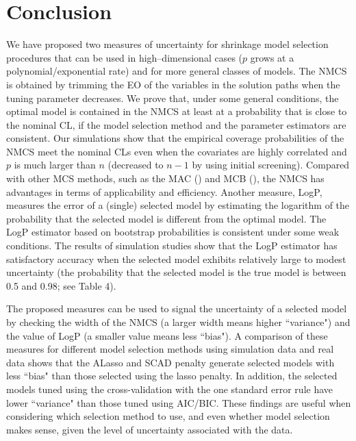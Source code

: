 \documentclass[12pt]{article} %
\theoremstyle{definition}
\begin{document}


\section{Conclusion}
We have proposed two measures of uncertainty for shrinkage model selection procedures that can be used in high–dimensional cases ($p$ grows at a polynomial/exponential rate) and for more general classes of models. The NMCS is obtained by trimming the EO of the variables in the solution paths when the tuning parameter decreases. We prove that, under some general conditions, the optimal model is contained in the NMCS at least at a probability that is close to the nominal CL, if the model selection method and the parameter estimators are consistent. Our simulations show that the empirical coverage probabilities of the NMCS meet the nominal CLs even when the covariates are highly correlated and $p$ is much larger than $n$ (decreased to $n-1$ by using initial screening). Compared with other MCS methods, such as the MAC (\citet{Liu2021}) and MCB (\citet{Li2019}), the NMCS has advantages in terms of applicability and efficiency.  Another measure, LogP, measures the error of a (single) selected model by estimating the logarithm of the probability that the selected model is different from the optimal model. The LogP estimator based on bootstrap probabilities is consistent under some weak conditions. The results of simulation studies show that the LogP estimator has satisfactory accuracy when the selected model exhibits relatively large to modest uncertainty (the probability that the selected model is the true model is between 0.5 and 0.98; see Table 4).

The proposed measures can be used to signal the uncertainty of a selected model by checking the width of the NMCS (a larger width means higher ``variance") and the value of LogP (a smaller value means less ``bias"). A comparison of these measures for different model selection methods using simulation data and real data shows that the ALasso and SCAD penalty generate selected models with less ``bias" than those selected using the lasso penalty. In addition, the selected models tuned using the cross-validation with the one standard error rule have lower ``variance" than those tuned using AIC/BIC. These findings are useful when considering which selection method to use, and even whether model selection makes sense, given the level of uncertainty associated with the data.
\end{document}
